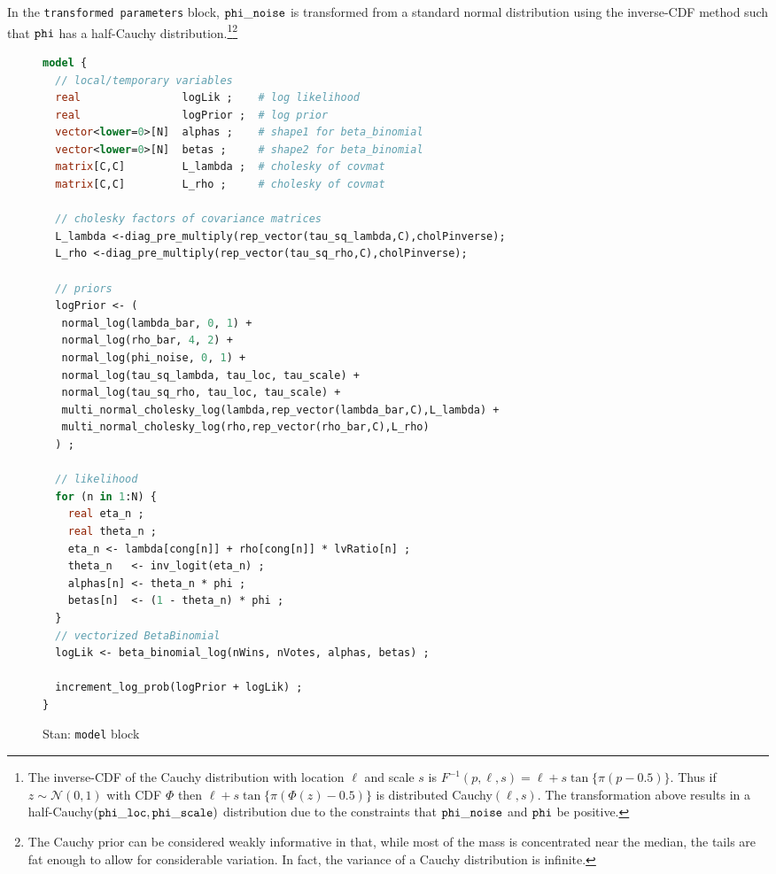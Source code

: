 In the {\tt transformed parameters} block, ${\tt phi\_noise}$ is transformed from a standard normal 
distribution using the inverse-CDF method such that ${\tt phi}$ has a half-Cauchy 
distribution.\footnote{The inverse-CDF of the Cauchy distribution with location $\ell$ and scale 
$s$ is $F^{-1}(p, \ell,s)  = \ell + s \tan{\{ \pi (p - 0.5)\}}$. Thus if $z \sim \mathcal{N}(0,1)$ with CDF 
$\Phi$ then $\ell + s \tan{\{ \pi (\Phi(z) - 0.5)\}}$ is distributed Cauchy$(\ell, s)$. The transformation 
above results in a half-Cauchy$({\tt phi\_loc}, {\tt phi\_scale})$ distribution due to the constraints 
that ${\tt phi\_noise}$ and ${\tt phi}$ be positive.}\footnote{The Cauchy prior can be considered 
weakly informative in that, while most of the mass is concentrated near the median, the tails are 
fat enough to allow for considerable variation. In fact, the variance of a Cauchy distribution is infinite.}




\begin{figure}[p]
\begin{lstlisting}[language=Stan, frame=trBL]
model {
  // local/temporary variables
  real                logLik ;    # log likelihood
  real                logPrior ;  # log prior
  vector<lower=0>[N]  alphas ;    # shape1 for beta_binomial 
  vector<lower=0>[N]  betas ;     # shape2 for beta_binomial
  matrix[C,C]         L_lambda ;  # cholesky of covmat
  matrix[C,C]         L_rho ;     # cholesky of covmat
  
  // cholesky factors of covariance matrices
  L_lambda <-diag_pre_multiply(rep_vector(tau_sq_lambda,C),cholPinverse);
  L_rho <-diag_pre_multiply(rep_vector(tau_sq_rho,C),cholPinverse);
  
  // priors
  logPrior <- (
   normal_log(lambda_bar, 0, 1) + 
   normal_log(rho_bar, 4, 2) + 
   normal_log(phi_noise, 0, 1) +
   normal_log(tau_sq_lambda, tau_loc, tau_scale) +
   normal_log(tau_sq_rho, tau_loc, tau_scale) +
   multi_normal_cholesky_log(lambda,rep_vector(lambda_bar,C),L_lambda) +
   multi_normal_cholesky_log(rho,rep_vector(rho_bar,C),L_rho) 
  ) ;
  
  // likelihood
  for (n in 1:N) {
    real eta_n ;
    real theta_n ;
    eta_n <- lambda[cong[n]] + rho[cong[n]] * lvRatio[n] ;
    theta_n   <- inv_logit(eta_n) ;    
    alphas[n] <- theta_n * phi ;
    betas[n]  <- (1 - theta_n) * phi ;
  }
  // vectorized BetaBinomial
  logLik <- beta_binomial_log(nWins, nVotes, alphas, betas) ; 
  
  increment_log_prob(logPrior + logLik) ; 
}
\end{lstlisting}
\caption{Stan: {\tt model} block}
\label{stan_model}
\end{figure}
%


